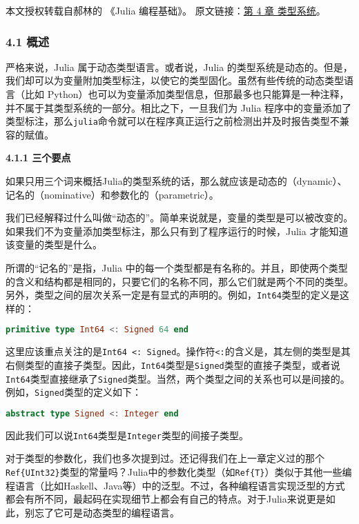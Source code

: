
本文授权转载自郝林的 《Julia 编程基础》。 原文链接：\href{https://github.com/hyper0x/JuliaBasics/blob/master/book/ch04.md}{第 4 章 类型系统}。


\subsubsection{4.1 概述}

严格来说，Julia 属于动态类型语言。或者说，Julia 的类型系统是动态的。但是，我们却可以为变量附加类型标注，以使它的类型固化。虽然有些传统的动态类型语言（比如 Python）也可以为变量添加类型信息，但那最多也只能算是一种注释，并不属于其类型系统的一部分。相比之下，一旦我们为 Julia 程序中的变量添加了类型标注，那么\verb`julia`命令就可以在程序真正运行之前检测出并及时报告类型不兼容的赋值。

\textbf{4.1.1 三个要点}

如果只用三个词来概括Julia的类型系统的话，那么就应该是动态的（dynamic）、记名的（nominative）和参数化的（parametric）。

我们已经解释过什么叫做“动态的”。简单来说就是，变量的类型是可以被改变的。如果我们不为变量添加类型标注，那么只有到了程序运行的时候，Julia 才能知道该变量的类型是什么。

所谓的“记名的”是指，Julia 中的每一个类型都是有名称的。并且，即使两个类型的含义和结构都是相同的，只要它们的名称不同，那么它们就是两个不同的类型。另外，类型之间的层次关系一定是有显式的声明的。例如，\verb`Int64`类型的定义是这样的：

\begin{lstlisting}[language=julia]
primitive type Int64 <: Signed 64 end
\end{lstlisting}

这里应该重点关注的是\verb`Int64 <: Signed`。操作符\verb`<:`的含义是，其左侧的类型是其右侧类型的直接子类型。因此，\verb`Int64`类型是\verb`Signed`类型的直接子类型，或者说\verb`Int64`类型直接继承了\verb`Signed`类型。当然，两个类型之间的关系也可以是间接的。例如，\verb`Signed`类型的定义如下：

\begin{lstlisting}[language=julia]
abstract type Signed <: Integer end
\end{lstlisting}

因此我们可以说\verb`Int64`类型是\verb`Integer`类型的间接子类型。

对于类型的参数化，我们也多次提到过。还记得我们在上一章定义过的那个\verb`Ref{UInt32}`类型的常量吗？Julia中的参数化类型（如\verb`Ref{T}`）类似于其他一些编程语言（比如Haskell、Java等）中的泛型。不过，各种编程语言实现泛型的方式都会有所不同，最起码在实现细节上都会有自己的特点。对于Julia来说更是如此，别忘了它可是动态类型的编程语言。

